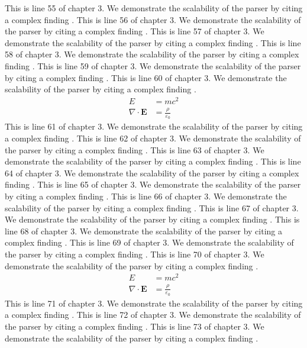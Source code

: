This is line 55 of chapter 3. We demonstrate the scalability of the parser by citing a complex finding \cite{ref3_55}.
This is line 56 of chapter 3. We demonstrate the scalability of the parser by citing a complex finding \cite{ref3_56}.
This is line 57 of chapter 3. We demonstrate the scalability of the parser by citing a complex finding \cite{ref3_57}.
This is line 58 of chapter 3. We demonstrate the scalability of the parser by citing a complex finding \cite{ref3_58}.
This is line 59 of chapter 3. We demonstrate the scalability of the parser by citing a complex finding \cite{ref3_59}.
This is line 60 of chapter 3. We demonstrate the scalability of the parser by citing a complex finding \cite{ref3_60}.
\begin{align*}
  E &= mc^2 \\
  \nabla \cdot \mathbf{E} &= \frac{\rho}{\varepsilon_0}
\end{align*}
This is line 61 of chapter 3. We demonstrate the scalability of the parser by citing a complex finding \cite{ref3_61}.
This is line 62 of chapter 3. We demonstrate the scalability of the parser by citing a complex finding \cite{ref3_62}.
This is line 63 of chapter 3. We demonstrate the scalability of the parser by citing a complex finding \cite{ref3_63}.
This is line 64 of chapter 3. We demonstrate the scalability of the parser by citing a complex finding \cite{ref3_64}.
This is line 65 of chapter 3. We demonstrate the scalability of the parser by citing a complex finding \cite{ref3_65}.
This is line 66 of chapter 3. We demonstrate the scalability of the parser by citing a complex finding \cite{ref3_66}.
This is line 67 of chapter 3. We demonstrate the scalability of the parser by citing a complex finding \cite{ref3_67}.
This is line 68 of chapter 3. We demonstrate the scalability of the parser by citing a complex finding \cite{ref3_68}.
This is line 69 of chapter 3. We demonstrate the scalability of the parser by citing a complex finding \cite{ref3_69}.
This is line 70 of chapter 3. We demonstrate the scalability of the parser by citing a complex finding \cite{ref3_70}.
\begin{align*}
  E &= mc^2 \\
  \nabla \cdot \mathbf{E} &= \frac{\rho}{\varepsilon_0}
\end{align*}
This is line 71 of chapter 3. We demonstrate the scalability of the parser by citing a complex finding \cite{ref3_71}.
This is line 72 of chapter 3. We demonstrate the scalability of the parser by citing a complex finding \cite{ref3_72}.
This is line 73 of chapter 3. We demonstrate the scalability of the parser by citing a complex finding \cite{ref3_73}.
